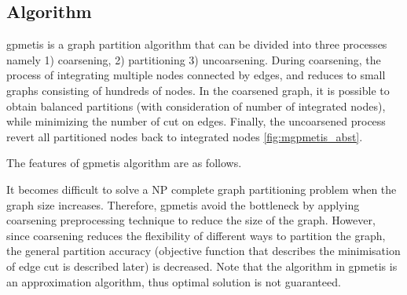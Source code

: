 \subsection{Algorithm}
gpmetis is a graph partition algorithm that can be divided into three processes namely 1) coarsening, 2) partitioning 3) uncoarsening.
During coarsening, the process of integrating multiple nodes  connected by edges, and reduces to small graphs consisting of hundreds of nodes.   
In the coarsened graph, it is possible to obtain balanced partitions (with consideration of number of integrated nodes), while minimizing the number of cut on edges. 
Finally, the  uncoarsened process revert all partitioned nodes back to integrated nodes \ref{fig:mgpmetis_abst}.  

The features of gpmetis algorithm are as follows. 

It becomes difficult to solve a NP complete graph partitioning problem when the graph size increases. Therefore, gpmetis avoid the bottleneck by applying coarsening preprocessing technique to reduce the size of the graph. However, since coarsening reduces the flexibility of different ways to partition the graph,  the general partition accuracy (objective function that describes the minimisation of edge cut is described later) is decreased. 
Note that the algorithm in gpmetis is an approximation algorithm, thus optimal solution is not guaranteed. 


